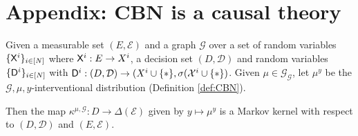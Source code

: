 \section{Appendix: CBN is a causal theory}\label{app:cbn_ct}

\begin{theorem}\label{th:cbn_MK}
Given a measurable set $(E,\mathcal{E})$ and a graph $\mathcal{G}$ over a set of random variables $\{\mathsf{X}^i\}_{i\in[N]}$ where $\mathsf{X}^i:E\to X^i$, a decision set $(D,\mathcal{D})$ and random variables $\{\mathsf{D}^i\}_{i\in[N]}$ with $\mathsf{D}^i:(D,\mathcal{D})\to (X^i\cup\{*\},\sigma(\mathcal{X}^i\cup\{*\})$. Given $\mu\in \mathscr{G}_{\mathcal{G}}$, let $\mu^y$ be the $\mathcal{G},\mu,y$-interventional distribution (Definition \ref{def:CBN}). 

Then the map $\kappa^{\mu,\mathcal{G}}:D\to \Delta(\mathcal{E})$ given by $y\mapsto \mu^y$ is a Markov kernel with respect to $(D,\mathcal{D})$ and $(E,\mathcal{E})$.
\end{theorem}

